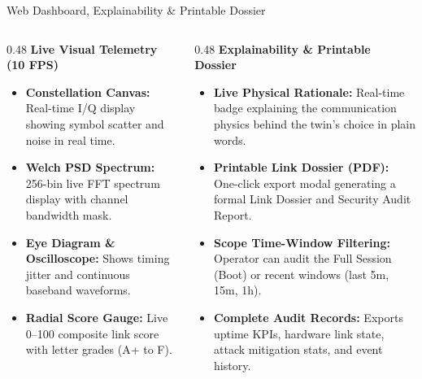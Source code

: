 \documentclass[aspectratio=169, 10pt]{beamer}
\begin{document}
\begin{frame}{Web Dashboard, Explainability \& Printable Dossier}
  \begin{columns}[T]
    \begin{column}{0.48\linewidth}
      \textbf{\color{primaryblue}\normalsize Live Visual Telemetry (10 FPS)}\\[0.10cm]
      \begin{itemize}\setlength{\itemsep}{6pt}\small
        \item \textbf{Constellation Canvas:} Real-time I/Q display showing symbol scatter and noise in real time.
        \item \textbf{Welch PSD Spectrum:} 256-bin live FFT spectrum display with channel bandwidth mask.
        \item \textbf{Eye Diagram \& Oscilloscope:} Shows timing jitter and continuous baseband waveforms.
        \item \textbf{Radial Score Gauge:} Live 0--100 composite link score with letter grades (A+ to F).
      \end{itemize}
    \end{column}
    
    \begin{column}{0.48\linewidth}
      \textbf{\color{primaryblue}\normalsize Explainability \& Printable Dossier}\\[0.10cm]
      \begin{itemize}\setlength{\itemsep}{6pt}\small
        \item \textbf{Live Physical Rationale:} Real-time badge explaining the communication physics behind the twin's choice in plain words.
        \item \textbf{Printable Link Dossier (PDF):} One-click export modal generating a formal Link Dossier and Security Audit Report.
        \item \textbf{Scope Time-Window Filtering:} Operator can audit the Full Session (Boot) or recent windows (last 5m, 15m, 1h).
        \item \textbf{Complete Audit Records:} Exports uptime KPIs, hardware link state, attack mitigation stats, and event history.
      \end{itemize}
    \end{column}
  \end{columns}
\end{frame}
\end{document}
